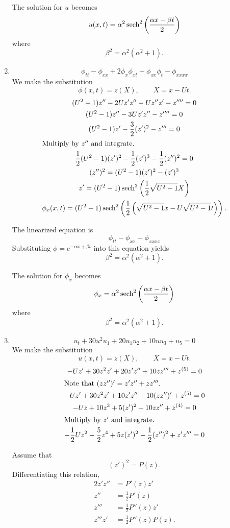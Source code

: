 \begin{Solution}
\begin{enumerate}
    The solution for $u$ becomes
    \[ u(x,t) = \alpha^2 \mathop{\mathrm{sech}}\nolimits^2 \left(\frac{\alpha x - \beta t}{2}\right) \]
    where
    \[ \beta^2 = \alpha^2(\alpha^2+1). \]
  \item
    \[\phi_{tt} - \phi_{xx} + 2 \phi_x \phi_{xt} + \phi_{xx} \phi_t - \phi_{xxxx}\]
    We make the substitution 
    \[\phi(x,t) = z(X), \qquad X = x-Ut. \]
    \begin{gather*}
      (U^2-1)z'' - 2 U z' z'' - U z'' z' - z'''' = 0 \\
      (U^2-1)z'' - 3 U z' z'' - z'''' = 0 \\
      (U^2-1)z' - \frac{3}{2} (z')^2 - z''' = 0 \\
      \intertext{Multiply by $z''$ and integrate.}
      \frac{1}{2}(U^2-1)(z')^2 - \frac{1}{2} (z')^3 - \frac{1}{2} (z'')^2 = 0 \\
      (z'')^2 = (U^2-1)(z')^2 - (z')^3 \\
      z' = (U^2-1) \mathop{\mathrm{sech}}\nolimits^2\left(\frac{1}{2} \sqrt{U^2-1} X\right) \\
      \phi_x(x,t) = (U^2-1) \mathop{\mathrm{sech}}\nolimits^2\left(\frac{1}{2}\left( \sqrt{U^2-1}x
          - U \sqrt{U^2-1} t \right) \right).
    \end{gather*}


    The linearized equation is
    \[\phi_{tt} - \phi_{xx} - \phi_{xxxx}\]
    Substituting $\phi = e^{-\alpha x + \beta t}$ into this equation yields
    \[ \beta^2 = \alpha^2(\alpha^2+1). \]

    The solution for $\phi_x$ becomes
    \[ \phi_x = \alpha^2 \mathop{\mathrm{sech}}\nolimits^2\left(\frac{\alpha x - \beta t}{2} \right) \]
    where
    \[ \beta^2 = \alpha^2(\alpha^2+1). \]
  \item
    \[u_t + 30 u^2 u_1 + 20 u_1 u_2 + 10 u u_3 + u_5 = 0 \]
    We make the substitution
    \[ u(x,t) = z(X), \qquad X=x-Ut. \]
    \begin{gather*}
      -Uz' + 30 z^2 z' + 20 z' z'' + 10 z z''' + z^{(5)} = 0 \\
      \intertext{Note that $(z z'')' = z'z'' + z z'''$.}
      -Uz' + 30 z^2 z' + 10 z' z'' + 10 (z z'')' + z^{(5)} = 0 \\
      -Uz + 10 z^3 + 5 (z')^2 + 10 z z'' + z^{(4)} = 0 \\
      \intertext{Multiply by $z'$ and integrate.}
      -\frac{1}{2} U z^2 + \frac{5}{2} z^4 + 5 z (z')^2 - \frac{1}{2} (z'')^2
      + z' z''' = 0 
    \end{gather*}

    Assume that
    \[ (z')^2 = P(z). \]
    Differentiating this relation,
    \begin{align*}
      2 z' z'' &= P'(z) z' \\
      z'' &= \frac{1}{2} P'(z) \\
      z''' &= \frac{1}{2} P''(z) z' \\
      z''' z' &= \frac{1}{2} P''(z) P(z).
    \end{align*}


\end{enumerate}
\end{Solution}
